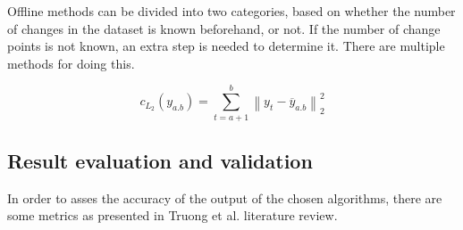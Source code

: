 Offline methods can be divided into two categories, based on whether the number of changes in the dataset is known beforehand, or not. If the number of change points is not known, an extra step is needed to determine it. There are multiple methods for doing this.



\begin{equation}
    c_{L_2}(y_{a.b}) = \sum^b_{t=a+1} \left\lVert y_t-\overline{y}_{a.b} \right\rVert ^2_2%
    \label{eq:l2}
\end{equation}


\subsection{Result evaluation and validation} \label{subsec:validation}

In order to asses the accuracy of the output of the chosen algorithms, there are some metrics as presented in Truong et al. \cite{truongSelectiveReviewOffline2020} literature review.






